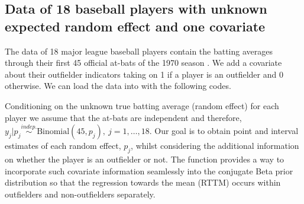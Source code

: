 \documentclass[article]{jss}
\begin{document}
\subsection[Unknown Second-level Mean and One Covariate]{Data of 18 baseball players with unknown expected random effect and one covariate} 

The data of 18 major league baseball players contain the batting averages through their first 45 official at-bats of the 1970 season \citep{1975}. We add a covariate about their outfielder indicators taking on 1 if a player is an outfielder and 0 otherwise. We can load the data into  with the following codes.
\begin{CodeChunk}
\end{CodeChunk}
Conditioning on the unknown true batting average (random effect) for each player we assume that the at-bats are independent and therefore, $y_{j}\vert p_{j} \textrm{Binomial}(45, p_{j}), ~j=1, \ldots, 18$. Our goal is to obtain point and interval estimates of each random effect, $p_j$, whilst considering the additional information on whether the player is an outfielder or not. The function  provides a way to incorporate such covariate information seamlessly into the conjugate Beta prior distribution so that the regression towards the mean (RTTM) occurs within outfielders and non-outfielders separately. %
\end{document}

